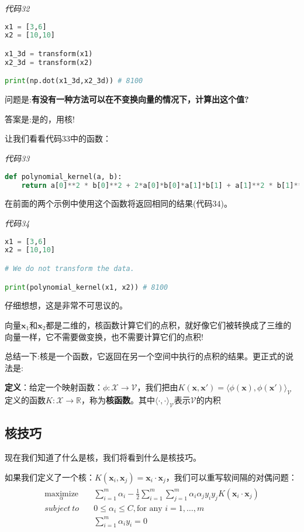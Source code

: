 \emph{代码32}

\begin{lstlisting}[language=python]
x1 = [3,6] 
x2 = [10,10] 

x1_3d = transform(x1) 
x2_3d = transform(x2)

print(np.dot(x1_3d,x2_3d)) # 8100

\end{lstlisting}
问题是:\textbf{有没有一种方法可以在不变换向量的情况下，计算出这个值?}

答案是:是的，用核!

让我们看看代码33中的函数：

\emph{代码33}

\begin{lstlisting}[language=python]
def polynomial_kernel(a, b): 
    return a[0]**2 * b[0]**2 + 2*a[0]*b[0]*a[1]*b[1] + a[1]**2 * b[1]**2
\end{lstlisting}

在前面的两个示例中使用这个函数将返回相同的结果(代码34)。

\emph{代码34}

\begin{lstlisting}[language=python]
x1 = [3,6] 
x2 = [10,10] 

# We do not transform the data. 

print(polynomial_kernel(x1, x2)) # 8100
\end{lstlisting}

仔细想想，这是非常不可思议的。

向量$\mathbf{x}_1$和$\mathbf{x}_2$都是二维的，核函数计算它们的点积，就好像它们被转换成了三维的向量一样，它不需要做变换，也不需要计算它们的点积!

总结一下:核是一个函数，它返回在另一个空间中执行的点积的结果。更正式的说法是:

\textbf{定义}：给定一个映射函数：$\phi: \mathcal{X} \rightarrow \mathcal{V}$，我们把由$K(\mathbf{x},\mathbf{x}')=\langle \phi(\mathbf{x}),\phi(\mathbf{x}')\rangle_\mathcal{V}$定义的函数$K:\mathcal{X} \rightarrow \mathbb{R}$，称为\textbf{核函数}。其中$\langle\cdot,\cdot\rangle_\mathcal{V}$表示$\mathcal{V}$的内积

\subsection{核技巧}

现在我们知道了什么是核，我们将看到什么是核技巧。

如果我们定义了一个核：$K(\mathbf{x}_i,\mathbf{x}_j) = \mathbf{x}_i \cdot \mathbf{x}_j$，我们可以重写软间隔的对偶问题：
\begin{gather*}
\begin{align*}
\underset{\alpha}{\text{maximize}} \quad & \sum_{i=1}^m \alpha_i - \frac{1}{2}\sum_{i=1}^m\sum_{j=1}^m \alpha_i \alpha_j y_i y_j K(\mathbf{x}_i \cdot \mathbf{x}_j)  \\
subject\ to \quad & 0 \leq \alpha_i \leq C,\text{for any }i=1,\dots,m \\
& \sum_{i=1}^m \alpha_i y_i = 0
\end{align*}
\end{gather*}

